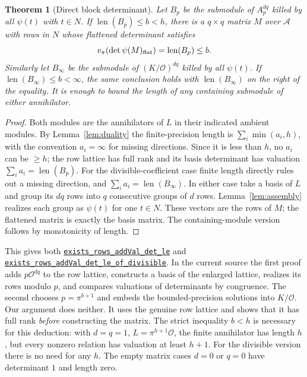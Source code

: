 \documentclass[11pt]{article}
\newtheorem{theorem}{Theorem}[section]
\newcommand{\Ocal}{\mathcal O}
\newcommand{\len}{\operatorname{len}}
\newcommand{\val}{v_\pi}
\newcommand{\src}[3]{\href{https://github.com/VladimirReshetnikov/ProveIt/blob/835c3695d07c0f77060c5cc63f92eeb52a7d21c2/Analysis/GeneralizedRiemannHypothesis/Lean/grh/src/#1.lean\#L#2}{#3}}
\newcommand{\bb}[2]{\src{Lib/General/Algebra/BlockFittingBound}{#1}{#2}}
\begin{document}
\begin{theorem}[Direct block determinant]\label{thm:block}
Let $B_p$ be the submodule of $A_p^{dq}$ killed by all $\psi(t)$ with $t\in N$. If $\len(B_p)\le b<h$, there is a $q\times q$ matrix $M$ over $\mathcal A$ with rows in $N$ whose flattened determinant satisfies
\[
   \val(\det \psi(M)_{\rm flat})=\len(B_p)\le b.
\]
Similarly let $B_\infty$ be the submodule of $(K/\Ocal)^{dq}$ killed by all $\psi(t)$. If $\len(B_\infty)\le b<\infty$, the same conclusion holds with $\len(B_\infty)$ on the right of the equality. It is enough to bound the length of any containing submodule of either annihilator.
\end{theorem}
\begin{proof}
Both modules are the annihilators of $L$ in their indicated ambient modules. By Lemma~\ref{lem:duality} the finite-precision length is $\sum_i\min(a_i,h)$, with the convention $a_i=\infty$ for missing directions. Since it is less than $h$, no $a_i$ can be $\ge h$; the row lattice has full rank and its basis determinant has valuation $\sum_i a_i=\len(B_p)$. For the divisible-coefficient case finite length directly rules out a missing direction, and $\sum_i a_i=\len(B_\infty)$. In either case take a basis of $L$ and group its $dq$ rows into $q$ consecutive groups of $d$ rows. Lemma~\ref{lem:assembly} realizes each group as $\psi(t)$ for one $t\in N$. These vectors are the rows of $M$; the flattened matrix is exactly the basis matrix. The containing-module version follows by monotonicity of length.
\end{proof}

This gives both \bb{36}{\texttt{exists\_rows\_addVal\_det\_le}} and \bb{157}{\texttt{exists\_rows\_addVal\_det\_le\_of\_divisible}}. In the current source the first proof adds $p\Ocal^{dq}$ to the row lattice, constructs a basis of the enlarged lattice, realizes its rows modulo $p$, and compares valuations of determinants by congruence. The second chooses $p=\pi^{b+1}$ and embeds the bounded-precision solutions into $K/\Ocal$. Our argument does neither. It uses the genuine row lattice and shows that it has full rank \emph{before} constructing the matrix. The strict inequality $b<h$ is necessary for this deduction: with $d=q=1$, $L=\pi^{h+1}\Ocal$, the finite annihilator has length $h$, but every nonzero relation has valuation at least $h+1$. For the divisible version there is no need for any $h$. The empty matrix cases $d=0$ or $q=0$ have determinant $1$ and length zero.
\end{document}
